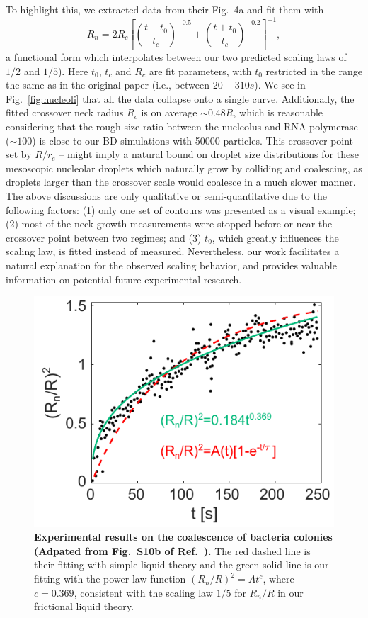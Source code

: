 \documentclass[%
reprint,
amsmath,amssymb,
aps,
]{revtex4-2}
\begin{document}
 To highlight this, we extracted data from their Fig.~4a and fit them with 
 \begin{equation}
     R_n  = 2R_c\left[\left(\frac{t+t_0}{t_c}\right)^{-0.5}+\left(\frac{t+t_0}{t_c}\right)^{-0.2}\right]^{-1},
 \end{equation}
a functional form which interpolates between our two predicted scaling laws  of $1/2$ and $1/5$). Here $t_0$, $t_c$ and $R_c$ are fit parameters, with $t_0$ restricted in the range the same as in the original paper (i.e., between $20 - 310s$). We see in Fig.~\ref{fig:nucleoli} that all the data collapse onto a single curve. Additionally, the fitted crossover neck radius $R_c$ is on average $\sim 0.48R$, which is reasonable considering that the rough size ratio between the nucleolus and RNA polymerase ($\sim 100$) is close to our BD simulations with 50000 particles. This crossover point – set by $R/r_e$ – might imply a natural bound on droplet size distributions for these mesoscopic nucleolar droplets which naturally grow by colliding and coalescing, as droplets larger than the crossover scale would coalesce in a much slower manner. The above discussions are only qualitative or semi-quantitative due to the following factors: (1) only one set of contours was presented as a visual example; (2) most of the neck growth measurements were stopped before or near the crossover point between two regimes; and (3) $t_0$, which greatly influences the scaling law, is fitted instead of measured. Nevertheless, our work facilitates a natural explanation for the observed scaling behavior, and provides valuable information on potential future experimental research.
	
	\begin{figure}[h]
		\centering
		\includegraphics[width=\columnwidth]{Figure9.pdf}
		\caption{\textbf{Experimental results on the coalescence of bacteria colonies (Adpated from Fig.~S10b of Ref.~\cite{welker2018molecular}).} The red dashed line is their fitting with simple liquid theory and the green solid line is our fitting with the power law function $(R_n/R)^2=At^c$, where $c=0.369$, consistent with the scaling law $1/5$ for $R_n/R$ in our frictional liquid theory. }
		\label{fig:bacteria}
	\end{figure}
 
\end{document}
